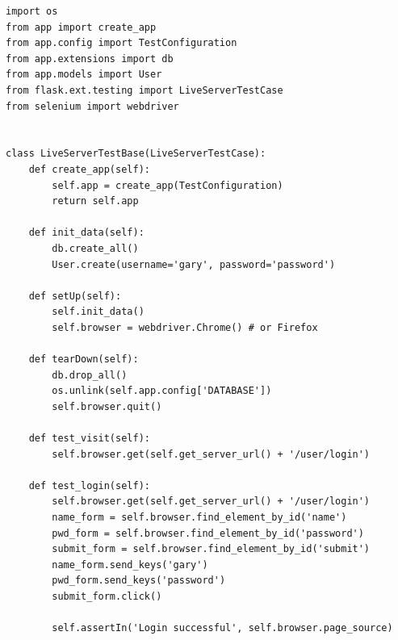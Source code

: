\documentclass[../main/main.tex]{subfiles}
\begin{document}
\begin{lstlisting}
import os
from app import create_app
from app.config import TestConfiguration
from app.extensions import db
from app.models import User
from flask.ext.testing import LiveServerTestCase
from selenium import webdriver


class LiveServerTestBase(LiveServerTestCase):
    def create_app(self):
        self.app = create_app(TestConfiguration)
        return self.app

    def init_data(self):
        db.create_all()
        User.create(username='gary', password='password')

    def setUp(self):
        self.init_data()
        self.browser = webdriver.Chrome() # or Firefox

    def tearDown(self):
        db.drop_all()
        os.unlink(self.app.config['DATABASE'])
        self.browser.quit()

    def test_visit(self):
        self.browser.get(self.get_server_url() + '/user/login')

    def test_login(self):
        self.browser.get(self.get_server_url() + '/user/login')
        name_form = self.browser.find_element_by_id('name')
        pwd_form = self.browser.find_element_by_id('password')
        submit_form = self.browser.find_element_by_id('submit')
        name_form.send_keys('gary')
        pwd_form.send_keys('password')
        submit_form.click()

        self.assertIn('Login successful', self.browser.page_source)

\end{lstlisting}
\end{document}
